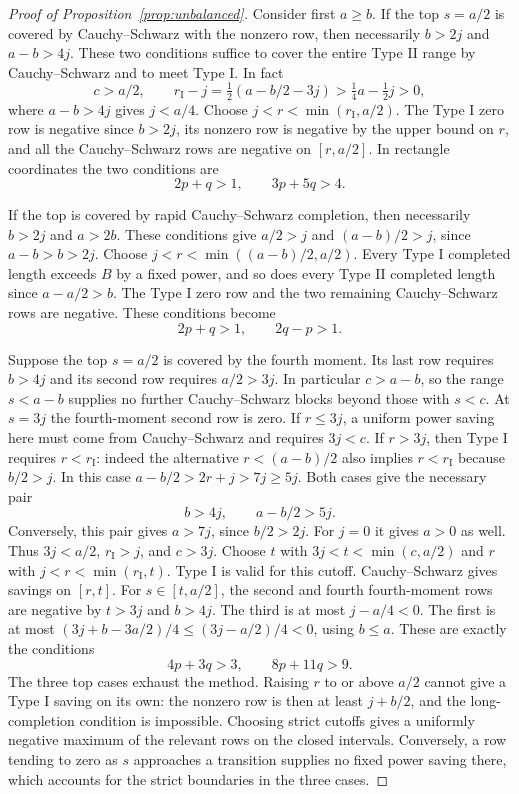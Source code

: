 \documentclass[11pt]{amsart}
\numberwithin{equation}{section}
\theoremstyle{remark}
\begin{document}
\begin{proof}[Proof of Proposition~\ref{prop:unbalanced}]
Consider first \(a\ge b\). If the top \(s=a/2\) is covered by
Cauchy--Schwarz with the nonzero row, then necessarily
\(b>2j\) and \(a-b>4j\). These two conditions suffice to cover the entire
Type II range by Cauchy--Schwarz and to meet Type I. In fact
\[
 c>a/2,\qquad
 r_{\mathrm I}-j
   =\tfrac12(a-b/2-3j)>\tfrac14 a-\tfrac12j>0,
\]
where \(a-b>4j\) gives \(j<a/4\).
Choose \(j<r<\min(r_{\mathrm I},a/2)\).
The Type I zero row is negative since \(b>2j\), its nonzero row
is negative by the upper bound on \(r\), and all the Cauchy--Schwarz
rows are negative on \([r,a/2]\).
In rectangle coordinates the two conditions are
\[
                      2p+q>1,\qquad 3p+5q>4 .
\]

If the top is covered by rapid Cauchy--Schwarz completion, then
necessarily \(b>2j\) and \(a>2b\). These conditions give \(a/2>j\)
and \((a-b)/2>j\), since \(a-b>b>2j\).
Choose \(j<r<\min((a-b)/2,a/2)\). Every Type I completed length
exceeds \(B\) by a fixed power, and so does every Type II completed
length since \(a-a/2>b\). The Type I zero row and the two remaining
Cauchy--Schwarz rows are negative. These conditions become
\[
                        2p+q>1,\qquad 2q-p>1 .
\]

Suppose the top \(s=a/2\) is covered by the fourth moment.
Its last row requires \(b>4j\) and its second row requires
\(a/2>3j\). In particular \(c>a-b\), so the range \(s<a-b\) supplies
no further Cauchy--Schwarz blocks beyond those with \(s<c\).
At \(s=3j\) the fourth-moment second row is zero. If \(r\le3j\), a
uniform power saving here must come from Cauchy--Schwarz and
requires \(3j<c\). If \(r>3j\), then Type I requires \(r<r_{\mathrm I}\):
indeed the alternative \(r<(a-b)/2\) also implies \(r<r_{\mathrm I}\)
because \(b/2>j\). In this case
\(a-b/2>2r+j>7j\ge 5j\).
Both cases give the necessary pair
\[
                            b>4j,\qquad a-b/2>5j .
\]
Conversely, this pair gives \(a>7j\), since \(b/2>2j\).
For \(j=0\) it gives \(a>0\) as well. Thus
\(3j<a/2\), \(r_{\mathrm I}>j\), and \(c>3j\).
Choose \(t\) with \(3j<t<\min(c,a/2)\) and \(r\) with
\(j<r<\min(r_{\mathrm I},t)\). Type I is valid for this cutoff.
Cauchy--Schwarz gives savings on \([r,t]\).
For \(s\in[t,a/2]\), the second and fourth fourth-moment rows
are negative by \(t>3j\) and \(b>4j\).
The third is at most \(j-a/4<0\). The first is at most
\((3j+b-3a/2)/4\le (3j-a/2)/4<0\), using \(b\le a\).
These are exactly the conditions
\[
                       4p+3q>3,\qquad 8p+11q>9 .
\]
The three top cases exhaust the method. Raising \(r\) to or above
\(a/2\) cannot give a Type I saving on its own: the nonzero row is then
at least \(j+b/2\), and the long-completion condition is impossible.
Choosing strict cutoffs gives a uniformly negative maximum of the
relevant rows on the closed intervals. Conversely, a row tending to
zero as \(s\) approaches a transition supplies no fixed power saving
there, which accounts for the strict boundaries in the three cases.


\end{proof}
\end{document}
